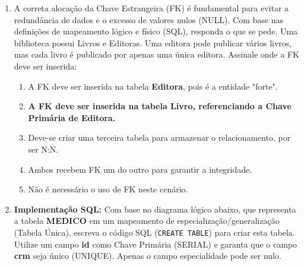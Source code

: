 \documentclass[12pt,a4paper]{article}
\begin{document}
\begin{enumerate}
    \item A correta alocação da Chave Estrangeira (FK) é fundamental para evitar a redundância de dados e o excesso de valores nulos (NULL). Com base nas definições de mapeamento lógico e físico (SQL), responda o que se pede. Uma biblioteca possui Livros e Editoras. Uma editora pode publicar vários livros, mas cada livro é publicado por apenas uma única editora. Assinale onde a FK deve ser inserida:
    \begin{enumerate}[label=\Alph*)]
        \item A FK deve ser inserida na tabela \textbf{Editora}, pois é a entidade "forte".
        \item \textbf{A FK deve ser inserida na tabela Livro, referenciando a Chave Primária de Editora.}
        \item Deve-se criar uma terceira tabela para armazenar o relacionamento, por ser N:N.
        \item Ambos recebem FK um do outro para garantir a integridade.
        \item Não é necessário o uso de FK neste cenário.
    \end{enumerate}

    \item \textbf{Implementação SQL:} Com base no diagrama lógico abaixo, que representa a tabela \textbf{MEDICO} em um mapeamento de especialização/generalização (Tabela Única), escreva o código SQL (\texttt{CREATE TABLE}) para criar esta tabela. Utilize um campo \textbf{id} como Chave Primária (SERIAL) e garanta que o campo \textbf{crm} seja único (UNIQUE). Apenas o campo especialidade pode ser nulo.

    \begin{center}
\end{center}
\end{enumerate}
\end{document}
